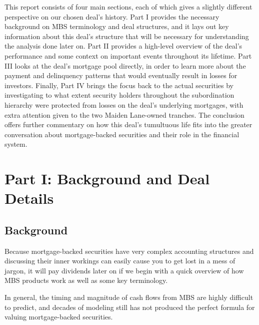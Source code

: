 \documentclass[12pt]{article}
\begin{document}
This report consists of four main sections, each of which gives a slightly different perspective on our chosen deal’s history. Part I provides the necessary background on MBS terminology and deal structures, and it lays out key information about this deal’s structure that will be necessary for understanding the analysis done later on. Part II provides a high-level overview of the deal’s performance and some context on important events throughout its lifetime. Part III looks at the deal’s mortgage pool directly, in order to learn more about the payment and delinquency patterns that would eventually result in losses for investors. Finally, Part IV brings the focus back to the actual securities by investigating to what extent security holders throughout the subordination hierarchy were protected from losses on the deal’s underlying mortgages, with extra attention given to the two Maiden Lane-owned tranches. The conclusion offers further commentary on how this deal’s tumultuous life fits into the greater conversation about mortgage-backed securities and their role in the financial system.


\section*{Part I: Background and Deal Details}
\subsection*{Background}

Because mortgage-backed securities have very complex accounting structures and discussing their inner workings can easily cause you to get lost in a mess of jargon, it will pay dividends later on if we begin with a quick overview of how MBS products work as well as some key terminology. 

In general, the timing and magnitude of cash flows from MBS are highly difficult to predict, and decades of modeling still has not produced the perfect formula for valuing mortgage-backed securities.
\end{document}
